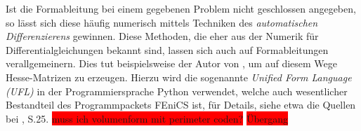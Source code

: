 Ist die Formableitung bei einem gegebenen Problem nicht geschlossen angegeben, so lässt sich diese häufig numerisch mittels Techniken des \textit{automatischen Differenzierens} gewinnen. Diese Methoden, die eher aus der Numerik für Differentialgleichungen bekannt sind, lassen sich auch auf Formableitungen verallgemeinern. Dies tut beispielsweise der Autor von \cite{auto-diff}, um auf diesem Wege Hesse-Matrizen zu erzeugen. Hierzu wird die sogenannte \textit{Unified Form Language (UFL)} in der Programmiersprache Python verwendet, welche auch wesentlicher Bestandteil des Programmpackets FEniCS ist, für Details, siehe etwa die Quellen bei \cite{fenics}, S.25. 
\colorbox{red}{muss ich volumenform mit perimeter coden?}
\colorbox{red}{Übergang}
